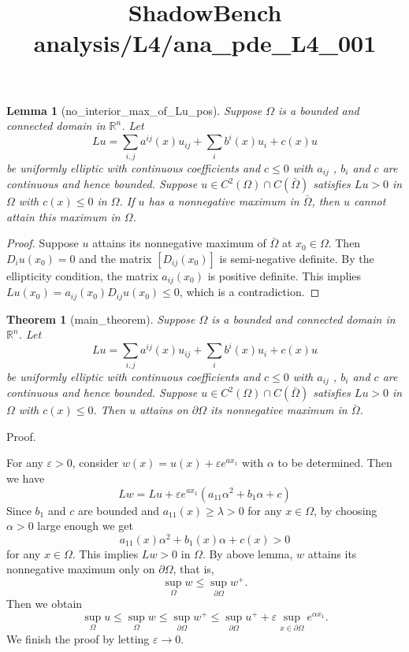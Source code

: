 \documentclass{article}
\title{ShadowBench analysis/L4/ana\_pde\_L4\_001}
\newtheorem{theorem}{Theorem}
\newtheorem{lemma}{Lemma}
\begin{document}
\maketitle

\begin{lemma}[no_interior_max_of_Lu_pos]
    Suppose $\Omega$ is a bounded and connected domain in $\mathbb{R}^n$. Let
\[
Lu=\sum_{i,j} a^{ij}(x)u_{ij}+\sum_i b^i(x)u_i+c(x)u
\]
be uniformly elliptic with continuous coefficients and $c\le 0$ with $a_{ij}$ , $b_i$ and $c$ are continuous and
hence bounded.
    Suppose $u \in C^2(\Omega) \cap C(\bar{\Omega})$ satisfies $L u > 0$ in $\Omega$ with $c(x) \le 0$ in $\Omega$. If $u$ has a nonnegative maximum in $\bar{\Omega}$, then $u$ cannot attain this maximum in $\Omega$. 
\end{lemma}

\begin{proof}
Suppose $u$ attains its nonnegative maximum of $\bar{\Omega}$ at  $x_0 \in \Omega $. Then
$D_i u(x_0) = 0$ and the matrix $[D_{ij}(x_0)]$
is semi-negative definite. By the ellipticity condition, the matrix $a_{ij}(x_0)$ is positive definite. This implies $Lu(x_0) =
a_{ij}(x_0) D_{ij}u(x_0) \le 0$, which is a contradiction.
\end{proof}


\begin{theorem}[main_theorem]
Suppose $\Omega$ is a bounded and connected domain in $\mathbb{R}^n$. Let
\[
Lu=\sum_{i,j} a^{ij}(x)u_{ij}+\sum_i b^i(x)u_i+c(x)u
\]
be uniformly elliptic with continuous coefficients and $c\le 0$ with $a_{ij}$ , $b_i$ and $c$ are continuous and
hence bounded.
Suppose $u \in C^2(\Omega) \cap C(\bar{\Omega})$ satisfies $L u > 0$ in $\Omega$ with $c(x) \le 0$. Then $u$
attains on $\partial \Omega$ its nonnegative maximum in $\bar{\Omega}$. 
\end{theorem}

Proof.

For any $\varepsilon > 0$, consider $w(x) = u(x) + \varepsilon e^{ax_1}$ with $\alpha$ to be determined. Then we have
\[L w =L u+  \varepsilon e^{ax_1} (a_{11} \alpha^2 + b_1 \alpha  + c)\]
Since $b_1$ and $c$ are bounded and $a_{11}(x) \ge \lambda > 0$  for any $x \in \Omega$, by choosing
$\alpha>0$ large enough we get
\[a_{11}(x) \alpha^2 + b_1(x)\alpha + c(x) > 0\] for any $x \in \Omega$.
This implies $Lw > 0$ in $\Omega$. By above lemma, $w$ attains its nonnegative maximum only on $\partial \Omega $, that is,
\[ \sup_\Omega w \le   \sup_{\partial \Omega} w^+. \]
Then we obtain
\[ \sup_{\Omega} u \le  \sup_{\Omega} w \le  \sup_{\partial\Omega} w^+ \le \sup_{\partial \Omega} u^+ + \varepsilon \sup_{x \in \partial \Omega} e^{\alpha x_1}. \]
We finish the proof by letting $\varepsilon \to 0 $.
\end{document}
